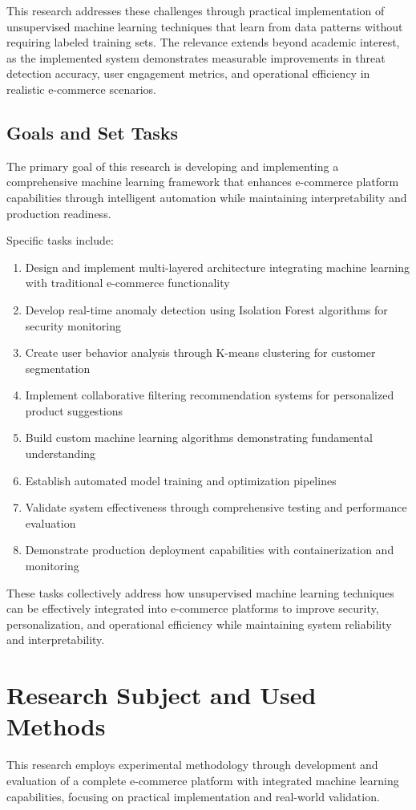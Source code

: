 \documentclass[12pt]{article}
\begin{document}
This research addresses these challenges through practical implementation of unsupervised machine learning techniques that learn from data patterns without requiring labeled training sets. The relevance extends beyond academic interest, as the implemented system demonstrates measurable improvements in threat detection accuracy, user engagement metrics, and operational efficiency in realistic e-commerce scenarios.

\subsection{Goals and Set Tasks}
The primary goal of this research is developing and implementing a comprehensive machine learning framework that enhances e-commerce platform capabilities through intelligent automation while maintaining interpretability and production readiness.

Specific tasks include:
\begin{enumerate}
    \item Design and implement multi-layered architecture integrating machine learning with traditional e-commerce functionality
    \item Develop real-time anomaly detection using Isolation Forest algorithms for security monitoring
    \item Create user behavior analysis through K-means clustering for customer segmentation
    \item Implement collaborative filtering recommendation systems for personalized product suggestions
    \item Build custom machine learning algorithms demonstrating fundamental understanding
    \item Establish automated model training and optimization pipelines
    \item Validate system effectiveness through comprehensive testing and performance evaluation
    \item Demonstrate production deployment capabilities with containerization and monitoring
\end{enumerate}

These tasks collectively address how unsupervised machine learning techniques can be effectively integrated into e-commerce platforms to improve security, personalization, and operational efficiency while maintaining system reliability and interpretability.

\section{Research Subject and Used Methods}
This research employs experimental methodology through development and evaluation of a complete e-commerce platform with integrated machine learning capabilities, focusing on practical implementation and real-world validation.
\end{document}
